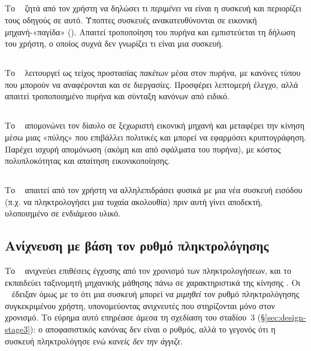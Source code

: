 \subsection{}

Το ~\cite{tian2015goodusb} ζητά από τον χρήστη να δηλώσει τι
\emph{περιμένει} να είναι η συσκευή και περιορίζει τους οδηγούς σε αυτό.
Ύποπτες συσκευές ανακατευθύνονται σε εικονική μηχανή-«παγίδα» ().
Απαιτεί τροποποίηση του πυρήνα και εμπιστεύεται τη δήλωση του χρήστη, ο οποίος
συχνά δεν γνωρίζει τι είναι μια συσκευή.

\subsection{}

Το ~\cite{tian2016usbfilter} λειτουργεί ως τείχος προστασίας
\emph{πακέτων}  μέσα στον πυρήνα, με κανόνες τύπου  που
μπορούν να αναφέρονται και σε διεργασίες. Προσφέρει λεπτομερή έλεγχο, αλλά
απαιτεί τροποποιημένο πυρήνα και σύνταξη κανόνων από ειδικό.

\subsection{}

Το ~\cite{angel2016cinch} απομονώνει τον δίαυλο  σε ξεχωριστή
εικονική μηχανή και μεταφέρει την κίνηση μέσω μιας «πύλης» που επιβάλλει
πολιτικές και μπορεί να εφαρμόσει κρυπτογράφηση. Παρέχει ισχυρή απομόνωση (ακόμη
και από σφάλματα του πυρήνα), με κόστος πολυπλοκότητας και απαίτηση
εικονικοποίησης.

\subsection{}

Το ~\cite{griscioli2016usbcheckin} απαιτεί από τον χρήστη να
αλληλεπιδράσει φυσικά με μια νέα συσκευή εισόδου (π.χ. να πληκτρολογήσει μια
τυχαία ακολουθία) πριν αυτή γίνει αποδεκτή, υλοποιημένο σε ενδιάμεσο υλικό.

\subsection{Ανίχνευση με βάση τον ρυθμό πληκτρολόγησης}

Το ~\cite{neuner2018usblock} ανιχνεύει επιθέσεις έγχυσης από τον
χρονισμό των πληκτρολογήσεων, και το ~\cite{kharraz2019usbesafe}
εκπαιδεύει ταξινομητή μηχανικής μάθησης πάνω σε χαρακτηριστικά της κίνησης
. Οι ~\cite{farhi2019malboard} έδειξαν όμως με το
 ότι μια συσκευή μπορεί να \emph{μιμηθεί} τον ρυθμό πληκτρολόγησης
συγκεκριμένου χρήστη, υπονομεύοντας ανιχνευτές που στηρίζονται μόνο στον χρονισμό.
Το εύρημα αυτό επηρέασε άμεσα τη σχεδίαση του σταδίου~3 (§\ref{sec:design-stage3}):
ο αποφασιστικός κανόνας δεν είναι ο ρυθμός, αλλά το γεγονός ότι η συσκευή
πληκτρολόγησε ενώ \emph{κανείς δεν την άγγιζε}.


